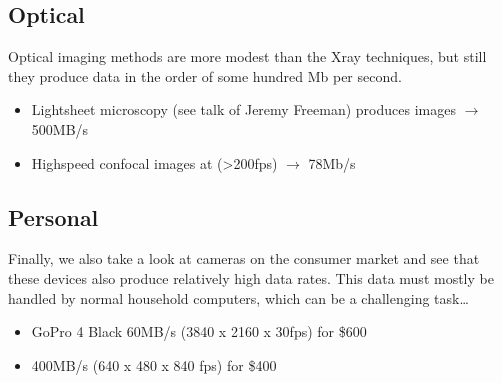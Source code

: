 \documentclass[letterpaper,10pt,english]{sphinxmanual}
\begin{document}
\subsection{Optical}
\label{\detokenize{01-Introduction:optical}}
\sphinxAtStartPar
Optical imaging methods are more modest than the X\sphinxhyphen{}ray techniques, but still they produce data in the order of some hundred Mb per second.
\begin{itemize}
\item {} 
\sphinxAtStartPar
Light\sphinxhyphen{}sheet microscopy (see talk of Jeremy Freeman) produces images \(\rightarrow\) 500MB/s

\item {} 
\sphinxAtStartPar
High\sphinxhyphen{}speed confocal images at (\textgreater{}200fps) \(\rightarrow\) 78Mb/s

\end{itemize}


\subsection{Personal}
\label{\detokenize{01-Introduction:personal}}
\sphinxAtStartPar
Finally, we also take a look at cameras on the consumer market and see that these devices also produce relatively high data rates. This data must mostly be handled by normal household computers, which can be a challenging task…
\begin{itemize}
\item {} 
\sphinxAtStartPar
GoPro 4 Black \sphinxhyphen{} 60MB/s (3840 x 2160 x 30fps) for \$600

\item {} 
\sphinxAtStartPar
{} \sphinxhyphen{} 400MB/s (640 x 480 x 840 fps) for \$400

\end{itemize}
\end{document}
